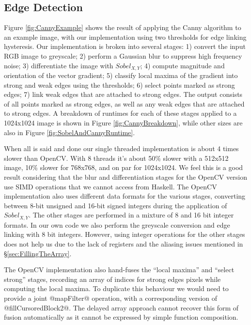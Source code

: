 \subsection{Edge Detection}
Figure \ref{fig:CannyExample} shows the result of applying the Canny algorithm to an example image, with our implementation using two thresholds for edge linking hysteresis. Our implementation is broken into several stages: 1) convert the input RGB image to greyscale;  2) perform a Gaussian blur to suppress high frequency noise; 3) differentiate the image with $Sobel_{X,Y}$; 4) compute magnitude and orientation of the vector gradient; 5) classify local maxima of the gradient into strong and weak edges using the thresholds; 6) select points marked as strong edges; 7) link weak edges that are attached to strong edges. The output consists of all points marked as strong edges, as well as any weak edges that are attached to strong edges. A breakdown of runtimes for each of these stages applied to a 1024x1024 image is shown in Figure \ref{fig:CannyBreakdown}, while other sizes are also in Figure \ref{fig:SobelAndCannyRuntime}.

When all is said and done our single threaded implementation is about 4 times slower than OpenCV. With 8 threads it's about 50\% slower with a 512x512 image, 10\% slower for 768x768, and on par for 1024x1024. We feel this is a good result considering that the blur and differentiation stages for the OpenCV version use SIMD operations that we cannot access from Haskell. The OpenCV implementation also uses different data formats for the various stages, converting between 8-bit unsigned and 16-bit signed integers during the application of $Sobel_{X,Y}$. The other stages are performed in a mixture of 8 and 16 bit integer formats. In our own code we also perform the greyscale conversion and edge linking with 8 bit integers. However, using integer operations for the other stages does not help us due to the lack of registers and the aliasing issues mentioned in \S\ref{sec:FillingTheArray}. 

The OpenCV implementation also hand-fuses the ``local maxima'' and ``select strong'' stages, recording an array of indices for strong edges pixels while computing the local maxima. To duplicate this behaviour we would need to provide a joint @mapFilter@ operation, with a corresponding version of @fillCursoredBlock2@. The delayed array approach cannot recover this form of fusion automatically as it cannot be expressed by simple function composition. 

